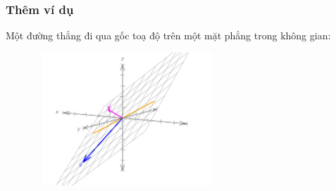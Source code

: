 \begin{frame}
    \frametitle{Thêm ví dụ}
    Một đường thẳng đi qua gốc toạ độ trên một mặt phẳng trong không gian:
    \begin{figure}[H]
        \centering
        \includegraphics[width=7cm, height=5cm]{Slides/Figure/lineonplaneinspace.png}
    \end{figure}
\end{frame}